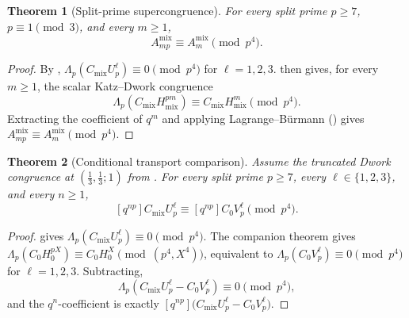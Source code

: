 \documentclass[11pt]{amsart}
\newtheorem{theorem}{Theorem}[section]
\theoremstyle{definition}
\theoremstyle{remark}
\begin{document}
\begin{theorem}[Split-prime supercongruence]\label{thm:split-final-closed}
For every split prime $p\ge 7$, $p\equiv 1\pmod 3$, and every $m\ge 1$,
\[
A_{mp}^{\mathrm{mix}}\equiv A_m^{\mathrm{mix}}\pmod{p^4}.
\]
\end{theorem}

\begin{proof}
By , $\Lambda_p(C_{\mathrm{mix}}U_p^\ell)\equiv 0\pmod{p^4}$ for $\ell=1,2,3$.  then gives, for every $m\ge 1$, the scalar Katz--Dwork congruence
\[
\Lambda_p(C_{\mathrm{mix}}H_{\mathrm{mix}}^{pm})\equiv C_{\mathrm{mix}}H_{\mathrm{mix}}^m\pmod{p^4}.
\]
Extracting the coefficient of $q^m$ and applying Lagrange--B\"urmann () gives $A_{mp}^{\mathrm{mix}}\equiv A_m^{\mathrm{mix}}\pmod{p^4}$.
\end{proof}

\begin{theorem}[Conditional transport comparison]\label{thm:transport-cancel}
Assume the truncated Dwork congruence at $(\tfrac13,\tfrac13;1)$ from \cite[Thm.~7.8]{Shvets-companion}. For every split prime $p\ge 7$, every $\ell\in\{1,2,3\}$, and every $n\ge 1$,
\[
[q^{np}]C_{\mathrm{mix}}U_p^\ell\equiv[q^{np}]C_0V_p^\ell\pmod{p^4}.
\]
\end{theorem}

\begin{proof}
 gives $\Lambda_p(C_{\mathrm{mix}}U_p^\ell)\equiv 0\pmod{p^4}$. The companion theorem gives $\Lambda_p(C_0H_0^{pX})\equiv C_0H_0^X\pmod{(p^4,X^4)}$, equivalent to $\Lambda_p(C_0V_p^\ell)\equiv 0\pmod{p^4}$ for $\ell=1,2,3$. Subtracting,
\[
\Lambda_p(C_{\mathrm{mix}}U_p^\ell-C_0V_p^\ell)\equiv 0\pmod{p^4},
\]
and the $q^n$-coefficient is exactly $[q^{np}]\bigl(C_{\mathrm{mix}}U_p^\ell-C_0V_p^\ell\bigr)$.
\end{proof}
\end{document}
